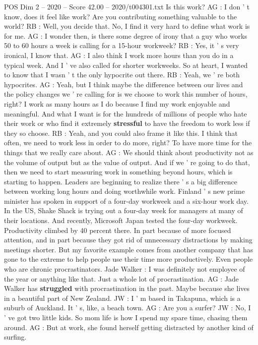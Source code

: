 \begin{textsample}{POS Dim 2 – 2020 – Score 42.00 – 2020/t004301.txt}
Is this work?
AG : I don ' t know, does it feel like work?
Are you contributing something valuable to the world?
RB : Well, you decide that.
No, I find it very hard to define what work is for me.
AG : I wonder then, is there some degree of irony that a guy who works 50 to 60 hours a week is calling for a 15-hour workweek?
RB : Yes, it ' s very ironical, I know that.
AG : I also think I work more hours than you do in a typical week.
And I ' ve also called for shorter workweeks.
So at heart, I wanted to know that I wasn ' t the only hypocrite out there.
RB : Yeah, we ' re both hypocrites.
AG : Yeah, but I think maybe the difference between our lives and the policy changes we ' re calling for is we choose to work this number of hours, right?
I work as many hours as I do because I find my work enjoyable and meaningful.
And what I want is for the hundreds of millions of people who hate their work or who find it extremely \textbf{stressful} to have the freedom to work less if they so choose.
RB : Yeah, and you could also frame it like this.
I think that often, we need to work less in order to do more, right?
To have more time for the things that we really care about.
AG : We should think about productivity not as the volume of output but as the value of output.
And if we ' re going to do that, then we need to start measuring work in something beyond hours, which is starting to happen.
Leaders are beginning to realize there ' s a big difference between working long hours and doing worthwhile work.
Finland ' s new prime minister has spoken in support of a four-day workweek and a six-hour work day.
In the US, Shake Shack is trying out a four-day week for managers at many of their locations.
And recently, Microsoft Japan tested the four-day workweek.
Productivity climbed by 40 percent there.
In part because of more focused attention, and in part because they got rid of unnecessary distractions by making meetings shorter.
But my favorite example comes from another company that has gone to the extreme to help people use their time more productively.
Even people who are chronic procrastinators.
Jade Walker : I was definitely not employee of the year or anything like that.
Just a whole lot of procrastination.
AG : Jade Walker has \textbf{struggled} with procrastination in the past.
Maybe because she lives in a beautiful part of New Zealand.
JW : I ' m based in Takapuna, which is a suburb of Auckland.
It ' s, like, a beach town.
AG : Are you a surfer?
JW : No, I ' ve got two little kids.
So mom life is how I spend my spare time, chasing them around.
AG : But at work, she found herself getting distracted by another kind of surfing.

\end{textsample}
